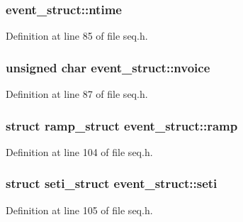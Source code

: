 \subsubsection[{\texorpdfstring{ntime}{ntime}}]{ event\+\_\+struct\+::ntime}\hypertarget{structevent__struct_ab3e215749b836371b7b3e00e5d6c771a}{}\label{structevent__struct_ab3e215749b836371b7b3e00e5d6c771a}


Definition at line 85 of file seq.\+h.

\subsubsection[{\texorpdfstring{nvoice}{nvoice}}]{\setlength{\rightskip}{0pt plus 5cm}unsigned char event\+\_\+struct\+::nvoice}\hypertarget{structevent__struct_a0e9d02e921edc61fa27becba1d624d4e}{}\label{structevent__struct_a0e9d02e921edc61fa27becba1d624d4e}


Definition at line 87 of file seq.\+h.

\subsubsection[{\texorpdfstring{ramp}{ramp}}]{\setlength{\rightskip}{0pt plus 5cm}struct {\bf ramp\+\_\+struct} event\+\_\+struct\+::ramp}\hypertarget{structevent__struct_a6746759ac548337e4648bc979716cebe}{}\label{structevent__struct_a6746759ac548337e4648bc979716cebe}


Definition at line 104 of file seq.\+h.

\subsubsection[{\texorpdfstring{seti}{seti}}]{\setlength{\rightskip}{0pt plus 5cm}struct {\bf seti\+\_\+struct} event\+\_\+struct\+::seti}\hypertarget{structevent__struct_a20dfe512ec6949208fc4b9a52380d53a}{}\label{structevent__struct_a20dfe512ec6949208fc4b9a52380d53a}


Definition at line 105 of file seq.\+h.

